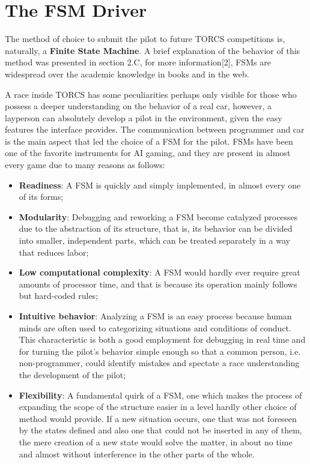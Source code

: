 \section{The FSM Driver}

	The method of choice to submit the pilot to future TORCS competitions is, naturally, a \textbf{Finite State Machine}.
	A brief explanation of the behavior of this method was presented in section 2.C, for more information[2], FSMs are
	widespread over the academic knowledge in books and in the web.
	
	A race inside TORCS has some peculiarities perhaps only visible for those who possess a deeper understanding on the
	behavior of a real car, however, a layperson can absolutely develop a pilot in the environment, given the easy 
	features the interface provides. The communication between programmer and car is the main aspect that led the choice
	of a FSM for the pilot. FSMs have been one of the favorite instruments for AI gaming, and they are present in almost
	every game due to many reasons as follows:

\begin{itemize}
	\item \textbf{Readiness}: A FSM is quickly and simply implemented, in almost every one of its forms;
	
	\item \textbf{Modularity}: Debugging and reworking a FSM become catalyzed processes due to the abstraction of its
	structure, that is, its behavior can be divided into smaller, independent parts, which can be treated separately
	in a way that reduces labor;
	
	\item \textbf{Low computational complexity}: A FSM would hardly ever require great amounts of processor time, and
	that is because its operation mainly follows but hard-coded rules;
	
	\item \textbf{Intuitive behavior}: Analyzing a FSM is an easy process because human minds are often used to
	categorizing situations and conditions of conduct. This characteristic is both a good employment for debugging in
	real time and for turning the pilot's behavior simple enough so that a common person, i.e. non-programmer, could
	identify mistakes and spectate a race understanding the development of the pilot;
	
	\item \textbf{Flexibility}: A fundamental quirk of a FSM, one which makes the process of expanding the scope of the
	structure easier in a level hardly other choice of method would provide. If a new situation occurs, one that was
	not foreseen by the states defined and also one that could not be inserted in any of them, the mere creation of a
	new state would solve the matter, in about no time and almost without interference in the other parts of the whole.
\end{itemize}

